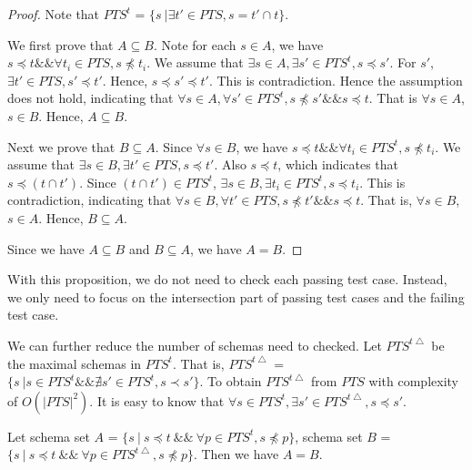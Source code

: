 \begin{proof}
Note that $PTS^{t}$ = $\{ s\ |\exists t' \in PTS, s =  t' \cap t \}$.

We first prove that $A \subseteq B$. Note for each $s \in A$, we have $s \preceq t \&\& \forall t_{i} \in PTS, s \npreceq t_{i}$. We assume that $\exists s \in A, \exists s' \in PTS^{t}, s \preceq s'$. For $s'$, $\exists t' \in PTS, s' \preceq t'$. Hence, $s  \preceq s' \preceq t'$. This is contradiction. Hence the assumption does not hold, indicating that $\forall s \in A, \forall s' \in PTS^{t}, s \npreceq s' \&\& s \preceq t$. That is $\forall s \in A$, $s \in B$. Hence, $A \subseteq B$.

Next we prove that $B \subseteq A$. Since $\forall s \in B$, we have $s \preceq t \&\& \forall t_{i} \in  PTS^{t}, s \npreceq t_{i}$. We assume that $\exists s \in B, \exists t' \in PTS, s \preceq t'$. Also $s \preceq t$, which indicates that $s \preceq (t \cap t')$.  Since $(t \cap t') \in PTS^{t} $, $\exists s \in B, \exists t_{i} \in PTS^{t}, s \preceq t_{i}$. This is contradiction, indicating that  $\forall s \in B, \forall t' \in PTS, s \npreceq t' \&\& s \preceq t$. That is, $\forall s \in B$, $s \in A$. Hence, $B \subseteq A$.

Since we have $A \subseteq B$ and $B \subseteq A$, we have $A = B$.
\end{proof}

With this proposition, we do not need to check each passing test case. Instead, we only need to focus on the intersection part of passing test cases and the failing test case.

We can further reduce the number of schemas need to checked. Let $PTS^{t\bigtriangleup}$ be the maximal schemas in $PTS^{t}$. That is, $PTS^{t\bigtriangleup}$ = $\{ s\ |  s \in PTS^{t} \&\& \nexists s'  \in PTS^{t}, s \prec s' \}$.  To obtain $PTS^{t\bigtriangleup}$ from $PTS$ with complexity of $O(|PTS|^{2})$. It is easy to know that $\forall s \in PTS^{t}, \exists s' \in PTS^{t\bigtriangleup},  s \preceq s'$.

\begin{proposition}\label{pro:healthysintequal2}
Let schema set $A$ = $\{ s\ |\ s \preceq t\ \&\&\ \forall p \in PTS^{t}, s \npreceq p \}$, schema set $B$ = $\{ s\ |\ s \preceq t\ \&\&\ \forall p \in PTS^{t\bigtriangleup}, s \npreceq p \}$. Then we have $A = B$.
\end{proposition}


